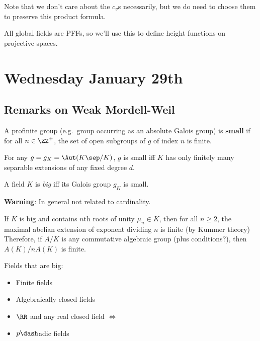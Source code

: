 Note that we don't care about the \(c_v\)s necessarily, but we do need
to choose them to preserve this product formula.

All global fields are PFFs, so we'll use this to define height functions
on projective spaces.

\hypertarget{wednesday-january-29th}{%
\section{Wednesday January 29th}\label{wednesday-january-29th}}

\hypertarget{remarks-on-weak-mordell-weil}{%
\subsection{Remarks on Weak
Mordell-Weil}\label{remarks-on-weak-mordell-weil}}

\begin{description}
\tightlist
\item[Definition (Small Groups)]
A profinite group (e.g.~group occurring as an absolute Galois group) is
\textbf{small} if for all \(n \in \ZZ^+\), the set of open subgroups of
\(g\) of index \(n\) is finite.
\item[Proposition]
For any \(g = g_K = \Aut(K\sep/K)\), \(g\) is small iff \(K\) has only
finitely many separable extensions of any fixed degree \(d\).
\item[Definition (Big Fields)]
A field \(K\) is \emph{big} iff its Galois group \(g_K\) is small.
\end{description}

\textbf{Warning}: In general not related to cardinality.

If \(K\) is big and contains \(n\)th roots of unity \(\mu_n \in K\),
then for all \(n\geq 2\), the maximal abelian extension of exponent
dividing \(n\) is finite (by Kummer theory) Therefore, if \(A/K\) is any
commutative algebraic group (plus conditions?), then \(A(K)/ nA(K)\) is
finite.

Fields that are big:

\begin{itemize}
\tightlist
\item
  Finite fields
\item
  Algebraically closed fields
\item
  \(\RR\) and any real closed field \(\iff\)
\item
  \(p\dash\)adic fields
\end{itemize}

